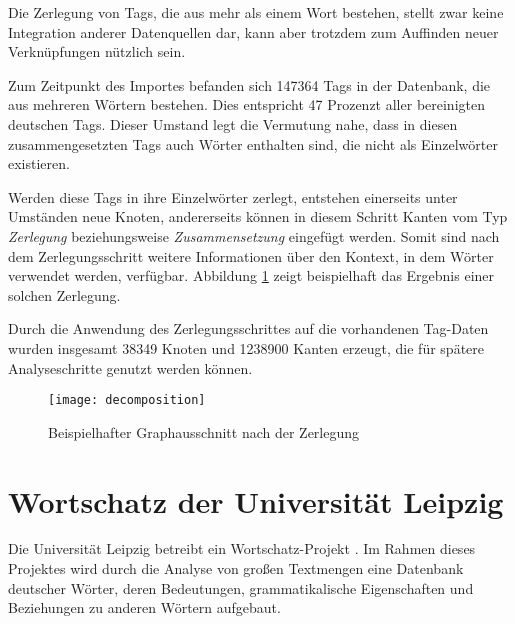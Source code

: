 Die Zerlegung von Tags, die aus mehr als einem Wort bestehen, stellt zwar keine Integration anderer Datenquellen dar, kann aber trotzdem zum Auffinden neuer Verknüpfungen nützlich sein.

Zum Zeitpunkt des Importes befanden sich \num{147364} Tags in der Datenbank, die aus mehreren Wörtern bestehen. Dies entspricht \num{47} Prozenzt aller bereinigten deutschen Tags. Dieser Umstand legt die Vermutung nahe, dass in diesen zusammengesetzten Tags auch Wörter enthalten sind, die nicht als Einzelwörter existieren.

Werden diese Tags in ihre Einzelwörter zerlegt, entstehen einerseits unter Umständen neue Knoten, andererseits können in diesem Schritt Kanten vom Typ \emph{Zerlegung} beziehungsweise \emph{Zusammensetzung} eingefügt werden. Somit sind nach dem Zerlegungsschritt weitere Informationen über den Kontext, in dem Wörter verwendet werden, verfügbar. Abbildung \ref{fig:decomposition} zeigt beispielhaft das Ergebnis einer solchen Zerlegung.

Durch die Anwendung des Zerlegungsschrittes auf die vorhandenen Tag-Daten wurden insgesamt \num{38349} Knoten und \num{1238900} Kanten erzeugt, die für spätere Analyseschritte genutzt werden können.

\begin{figure}
\centering
\texttt{[image: decomposition]}
\caption{Beispielhafter Graphausschnitt nach der Zerlegung}
\label{fig:decomposition}
\end{figure}


\section{Wortschatz der Universität Leipzig}

Die Universität Leipzig betreibt ein Wortschatz-Projekt \cite{ws2013}. Im Rahmen dieses Projektes wird durch die Analyse von großen Textmengen eine Datenbank deutscher Wörter, deren Bedeutungen, grammatikalische Eigenschaften und Beziehungen zu anderen Wörtern aufgebaut.